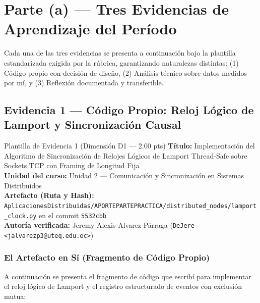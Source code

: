 \documentclass[11pt,a4paper]{article}
\begin{document}
\section{Parte (a) — Tres Evidencias de Aprendizaje del Período}

Cada una de las tres evidencias se presenta a continuación bajo la plantilla estandarizada exigida por la rúbrica, garantizando naturalezas distintas: (1) Código propio con decisión de diseño, (2) Análisis técnico sobre datos medidos por mí, y (3) Reflexión documentada y transferible.

\subsection{Evidencia 1 — Código Propio: Reloj Lógico de Lamport y Sincronización Causal}

\begin{evidenciabox}{Plantilla de Evidencia 1 (Dimensión D1 --- 2.00 pts)}
    \textbf{Título:} Implementación del Algoritmo de Sincronización de Relojes Lógicos de Lamport Thread-Safe sobre Sockets TCP con Framing de Longitud Fija\\
    \textbf{Unidad del curso:} Unidad 2 --- Comunicación y Sincronización en Sistemas Distribuidos\\
    \textbf{Artefacto (Ruta y Hash):} \texttt{AplicacionesDistribuidas/\allowbreak{}APORTEPARTEPRACTICA/\allowbreak{}distributed\_nodes/\allowbreak{}lamport\_clock.py} en el commit \texttt{5532cbb}\\
    \textbf{Autoría verificada:} Jeremy Alexis Alvarez Párraga (\texttt{DeJere <jalvarezp3@uteq.edu.ec>})
\end{evidenciabox}

\subsubsection{El Artefacto en Sí (Fragmento de Código Propio)}
A continuación se presenta el fragmento de código que escribí para implementar el reloj lógico de Lamport y el registro estructurado de eventos con exclusión mutua:
\end{document}
